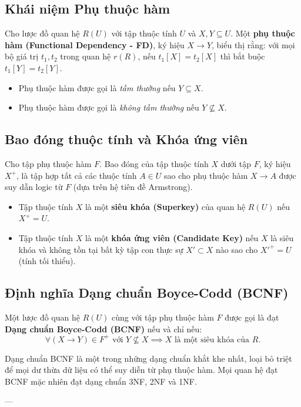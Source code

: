 \subsection{Khái niệm Phụ thuộc hàm}
Cho lược đồ quan hệ $R(U)$ với tập thuộc tính $U$ và $X, Y \subseteq U$. Một \textbf{phụ thuộc hàm (Functional Dependency - FD)}, ký hiệu $X \rightarrow Y$, biểu thị rằng: với mọi bộ giá trị $t_1, t_2$ trong quan hệ $r(R)$, nếu $t_1[X] = t_2[X]$ thì bắt buộc $t_1[Y] = t_2[Y]$.
\begin{itemize}
    \item Phụ thuộc hàm được gọi là \textit{tầm thường} nếu $Y \subseteq X$.
    \item Phụ thuộc hàm được gọi là \textit{không tầm thường} nếu $Y \not\subseteq X$.
\end{itemize}

\subsection{Bao đóng thuộc tính và Khóa ứng viên}
Cho tập phụ thuộc hàm $F$. Bao đóng của tập thuộc tính $X$ dưới tập $F$, ký hiệu $X^+$, là tập hợp tất cả các thuộc tính $A \in U$ sao cho phụ thuộc hàm $X \rightarrow A$ được suy dẫn logic từ $F$ (dựa trên hệ tiên đề Armstrong).
\begin{itemize}
    \item Tập thuộc tính $X$ là một \textbf{siêu khóa (Superkey)} của quan hệ $R(U)$ nếu $X^+ = U$.
    \item Tập thuộc tính $X$ là một \textbf{khóa ứng viên (Candidate Key)} nếu $X$ là siêu khóa và không tồn tại bất kỳ tập con thực sự $X' \subset X$ nào sao cho $X'^+ = U$ (tính tối thiểu).
\end{itemize}

\subsection{Định nghĩa Dạng chuẩn Boyce-Codd (BCNF)}
Một lược đồ quan hệ $R(U)$ cùng với tập phụ thuộc hàm $F$ được gọi là đạt \textbf{Dạng chuẩn Boyce-Codd (BCNF)} nếu và chỉ nếu:
$$\forall (X \rightarrow Y) \in F^+ \text{ với } Y \not\subseteq X \implies X \text{ là một siêu khóa của } R.$$

Dạng chuẩn BCNF là một trong những dạng chuẩn khắt khe nhất, loại bỏ triệt để mọi dư thừa dữ liệu có thể suy diễn từ phụ thuộc hàm. Mọi quan hệ đạt BCNF mặc nhiên đạt dạng chuẩn 3NF, 2NF và 1NF.

---

